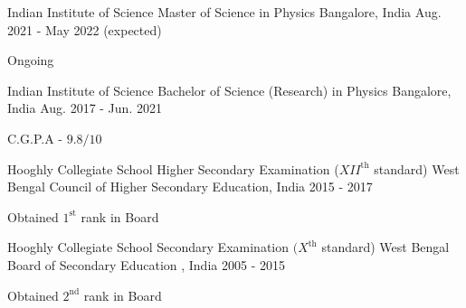 

\begin{cventries}

    \cventry
	{Indian Institute of Science} %
	{Master of Science in Physics} %
	{Bangalore, India} %
	{Aug. 2021 - May 2022 (expected)} %
	{
	\begin{cvitems} %
		\item {Ongoing}
	\end{cvitems}
	}

  \cventry
    {Indian Institute of Science} %
    {Bachelor of Science (Research) in Physics} %
    {Bangalore, India} %
    {Aug. 2017 - Jun. 2021} %
    {
      \begin{cvitems} %
        \item {C.G.P.A - $9.8/10$}
      \end{cvitems}
    }

  \cventry
	{Hooghly Collegiate School} %
	{Higher Secondary Examination ($XII^{\text{th}}$ standard)} %
	{West Bengal Council of Higher Secondary Education, India} %
	{2015 - 2017} %
	{
	\begin{cvitems} %
		\item {Obtained $1^{\text{st}}$ rank in Board}
	\end{cvitems}
	}
  \cventry
	{Hooghly Collegiate School} %
	{Secondary Examination $(X^{\text{th}}$ standard)} %
	{West Bengal Board of Secondary Education , India} %
	{2005 - 2015} %
	{
	\begin{cvitems} %
		\item {Obtained $2^{\text{nd}}$ rank in Board}
	\end{cvitems}
	}


\end{cventries}

